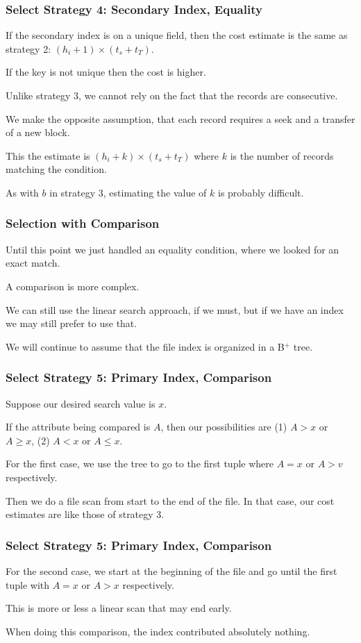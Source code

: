 \begin{frame}
\frametitle{Select Strategy 4: Secondary Index, Equality}
If the secondary index is on a unique field, then the cost estimate is the same as strategy 2:  $(h_{i} + 1) \times (t_{s} + t_{T})$.

If the key is not unique then the cost is higher. 

Unlike strategy 3, we cannot rely on the fact that the records are consecutive.

We make the opposite assumption, that each record requires a seek and a transfer of a new block. 

This the estimate is $(h_{i} + k) \times (t_{s} + t_{T})$ where $k$ is the number of records matching the condition.

As with $b$ in strategy 3, estimating the value of $k$ is probably difficult.


\end{frame}



\begin{frame}
\frametitle{Selection with Comparison}

Until this point we just handled an equality condition, where we looked for an exact match. 

A comparison is more complex. 

We can still use the linear search approach, if we must, but if we have an index we may still prefer to use that. 

We will continue to assume that the file index is organized in a B$^{+}$ tree.

\end{frame}

\begin{frame}
\frametitle{Select Strategy 5: Primary Index, Comparison}

Suppose our desired search value is $x$. 

If the attribute being compared is $A$, then our possibilities are (1) $A > x$ or $A \geq x$, (2) $A < x$ or $A \leq x$.

For the first case, we use the tree to go to the first tuple where $A = x$ or $A > v$ respectively. 

Then we do a file scan from start to the end of the file. In that case, our cost estimates are like those of strategy 3.
\end{frame}

\begin{frame}
\frametitle{Select Strategy 5: Primary Index, Comparison}

For the second case, we start at the beginning of the file and go until the first tuple with $A = x$ or $A > x$ respectively. 

This is more or less a linear scan that may end early.

When doing this comparison, the index contributed absolutely nothing.


\end{frame}


